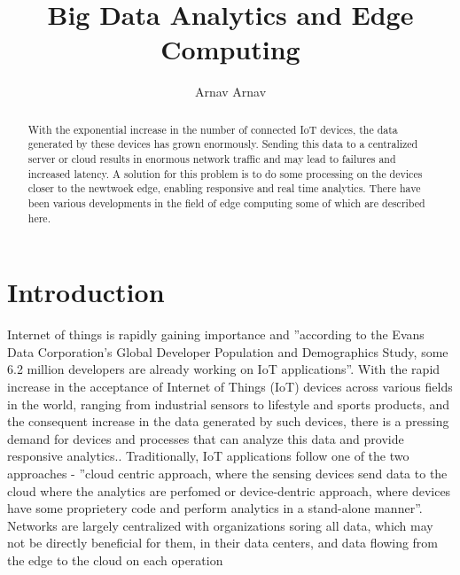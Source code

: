 \documentclass[sigconf]{acmart}
\begin{document}
\title{Big Data Analytics and Edge Computing}


\author{Arnav Arnav}

\begin{abstract}
With the exponential increase in the number of connected IoT devices, the data generated by these devices has grown enormously. Sending this data to a centralized server or cloud results in enormous network traffic and may lead to failures and increased latency. A solution for this problem is to do some processing on the devices closer to the newtwoek edge, enabling responsive and real time analytics. There have been various developments in the field of edge computing some of which are described here.
\end{abstract}

\maketitle
\section{Introduction}
Internet of things is rapidly gaining importance and ''according to the Evans Data Corporation’s Global Developer Population and Demographics Study, some 6.2 million developers are already working on IoT applications''.\cite{ibm_data_streaming_analytics} With the rapid increase in the acceptance of Internet of Things (IoT) devices across various fields in the world, ranging from industrial sensors to lifestyle and sports products, and the consequent increase in the data generated by such devices, there is a pressing demand for devices and processes that can analyze this data and provide responsive analytics.\cite{ieee_iot_cloud_analytics_newsletter}. Traditionally, IoT applications follow one of the two approaches - ''cloud centric approach, where the sensing devices send data to the cloud where the analytics are perfomed or device-dentric approach, where devices have some proprietery code and perform analytics in a stand-alone manner''\cite{ieee_iot_cloud_analytics_newsletter}. Networks are largely centralized with  organizations soring all data, which may not be directly beneficial for them, in their data centers, and data flowing from the edge to the cloud on each operation\cite{ibm_iot_edge}
\end{document}

